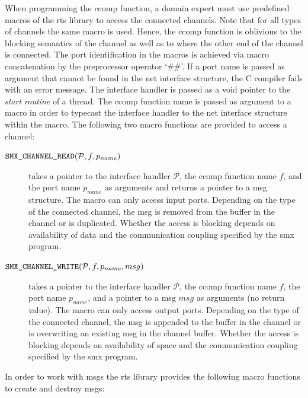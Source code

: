 When programming the \gls*{ccomp} function, a domain expert must use predefined macros of the \gls{rts} library to access the connected channels.
Note that for all types of channels the same macro is used.
Hence, the \gls*{ccomp} function is oblivious to the blocking semantics of the channel as well as to where the other end of the channel is connected.
The port identification in the macros is achieved via macro concatenation by the preprocessor operator `\#\#'.
If a port name is passed as argument that cannot be found in the net interface structure, the C compiler fails with an error message.
The interface handler is passed as a void pointer to the \emph{start routine} of a thread.
The \gls*{ccomp} function name is passed as argument to a macro in order to typecast the interface handler to the net interface structure within the macro.
The following two macro functions are provided to access a channel:
\begin{description}
    \item[$\textnormal{\tt SMX\_CHANNEL\_READ}(\mathcal{P}, f, p_{name})$] takes a pointer to the interface handler $\mathcal{P}$, the \gls*{ccomp} function name $f$, and the port name $p_{name}$ as arguments and returns a pointer to a \gls*{msg} structure.
        The macro can only access input ports.
        Depending on the type of the connected channel, the \gls*{msg} is removed from the buffer in the channel or is duplicated.
        Whether the access is blocking depends on availability of data and the communication coupling specified by the \gls*{smx} program.
    \item[$\textnormal{\tt SMX\_CHANNEL\_WRITE}(\mathcal{P}, f, p_{name}, msg)$] takes a pointer to the interface handler $\mathcal{P}$, the \gls*{ccomp} function name $f$, the port name $p_{name}$, and a pointer to a \gls*{msg} $msg$ as arguments (no return value).
        The macro can only access output ports.
        Depending on the type of the connected channel, the \gls*{msg} is appended to the buffer in the channel or is overwriting an existing \gls*{msg} in the channel buffer.
        Whether the access is blocking depends on availability of space and the communication coupling specified by the \gls*{smx} program.
\end{description}
In order to work with \glspl*{msg} the \gls{rts} library provides the following macro functions to create and destroy \glspl*{msg}:
